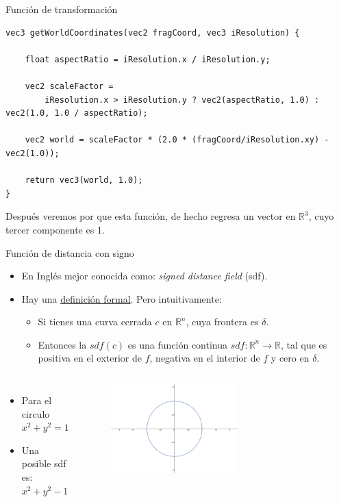 \begin{frame}[fragile]{Función de transformación}
\begin{listing}
\begin{verbatim}
vec3 getWorldCoordinates(vec2 fragCoord, vec3 iResolution) {

    float aspectRatio = iResolution.x / iResolution.y;

    vec2 scaleFactor =
        iResolution.x > iResolution.y ? vec2(aspectRatio, 1.0) : vec2(1.0, 1.0 / aspectRatio);

    vec2 world = scaleFactor * (2.0 * (fragCoord/iResolution.xy) - vec2(1.0));

    return vec3(world, 1.0);
}
\end{verbatim}
\end{listing}
Después veremos por que esta función, de hecho regresa un vector en $\mathbb{R}^3$, cuyo tercer componente es 1.
\end{frame}


\begin{frame}{Función de distancia con signo}

\begin{itemize}
    \item En Inglés mejor conocida como: \emph{signed distance field} (sdf).
    \item Hay una \href{https://en.wikipedia.org/wiki/Signed_distance_function}{definición formal}. Pero intuitivamente:
    \begin{itemize}
        \item Si tienes una curva cerrada $c$ en $\mathbb{R}^n$, cuya frontera es $\delta$.
        \item Entonces la $sdf(c)$ es una función continua $sdf: \mathbb{R}^n \rightarrow \mathbb{R}$, tal que es positiva en el exterior de $f$, negativa en el interior de $f$ y cero en $\delta$.
    \end{itemize}
\end{itemize}
\begin{columns}
     \begin{itemize}
         \item Para el circulo $x^2 + y^2 = 1$
         \item Una posible sdf es: $x^2 + y^2 - 1$
     \end{itemize}
        \begin{figure}[htb]
            \centering
            \includegraphics[width=0.6\textwidth]{img/unitCircle.png}
        \end{figure}
\end{columns}
\end{frame}

